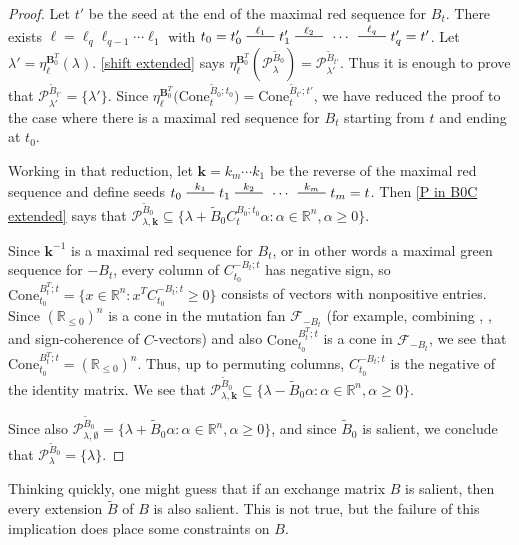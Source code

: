 \documentclass{amsart}
\theoremstyle{definition}
\theoremstyle{remark}
\numberwithin{equation}{section}
\newcommand{\reals}{\mathbb R}
\newcommand{\edge}{\,\,\rule[2.7pt]{20pt}{0.5pt}\,\,}
\newcommand{\set}[1]{{\lbrace #1 \rbrace}}
\newcommand{\F}{{\mathcal F}}
\newcommand{\0}{{\mathbf{0}}}
\newcommand{\Cone}{\mathrm{Cone}}
\newcommand{\kk}{\mathbf{k}}
\renewcommand{\ll}{{\boldsymbol\ell}}
\newcommand{\tB}{{\tilde{B}}}
\newcommand{\BB}{\mathbf{B}}
\renewcommand{\P}{\mathcal{P}}
\begin{document}
\begin{proof}%
Let $t'$ be the seed at the end of the maximal red sequence for $B_t$.
There exists $\ll=\ell_q\ell_{q-1}\cdots\ell_1$ with $t_0=t'_0\overset{\ell_1}{\edge}t'_1\overset{\ell_2}{\edge}\,\cdots\,\overset{\ell_q}{\edge}t'_q=t'$.
Let $\lambda'=\eta^{\BB_0^T}_\ll\!(\lambda)$.
\cref{shift extended} says $\eta^{\BB_0^T}_\ll\!(\P^{\tB_0}_\lambda)=\P^{\tB_{t'}}_{\lambda'}$.
Thus it is enough to prove that $\P^{\tB_{t'}}_{\lambda'}=\set{\lambda'}$.
Since $\eta_\ll^{\BB_0^T}\bigl(\Cone_t^{\tB_0;t_0}\bigr)=\Cone_t^{\tB_{t'};t'}$, we have reduced the proof to the case where there is a maximal red sequence for $B_t$ starting from $t$ and ending at $t_0$.

Working in that reduction, let $\kk=k_m\cdots k_1$ be the reverse of the maximal red sequence and define seeds $t_0\overset{k_1}{\edge}t_1\overset{k_2}{\edge}\,\cdots\,\overset{k_m}{\edge}t_m=t$.
Then \cref{P in B0C extended} says that $\P^{\tB_0}_{\lambda,\kk}\subseteq\set{\lambda+\tB_0C_t^{B_0;t_0}\alpha:\alpha\in\reals^n,\alpha\ge0}$.

Since $\kk^{-1}$ is a maximal red sequence for $B_t$, or in other words a maximal green sequence for $-B_t$, every column of $C_{t_0}^{-B_t;t}$ has negative sign, so $\Cone_{t_0}^{B_t^T;t}=\set{x\in\reals^n:x^TC_{t_0}^{-B_t;t}\ge0}$ consists of vectors with nonpositive entries.
Since $\left(\reals_{\le0}\right)^n$ is a cone in the mutation fan $\F_{-B_t}$ (for example, combining \mbox{\cite[Proposition~7.1]{universal}}, \mbox{\cite[Proposition~8.9]{universal}}, and sign-coherence of $C$-vectors) and also $\Cone_{t_0}^{B_t^T;t}$ is a cone in $\F_{-B_t}$, we see that $\Cone_{t_0}^{B_t^T;t}=\left(\reals_{\le0}\right)^n$.
Thus, up to permuting columns, $C_{t_0}^{-B_t;t}$ is the negative of the identity matrix.
We see that $\P^{\tB_0}_{\lambda,\kk}\subseteq\set{\lambda-\tB_0\alpha:\alpha\in\reals^n,\alpha\ge0}$.

Since also $\P^{\tB_0}_{\lambda,\emptyset}=\set{\lambda+\tB_0\alpha:\alpha\in\reals^n,\alpha\ge0}$, and since $\tB_0$ is salient, we conclude that $\P^{\tB_0}_\lambda=\set{\lambda}$.
\end{proof}

Thinking quickly, one might guess that if an exchange matrix $B$ is salient, then every extension $\tB$ of $B$ is also salient.
This is not true, but the failure of this implication does place some constraints on $B$.
\end{document}
